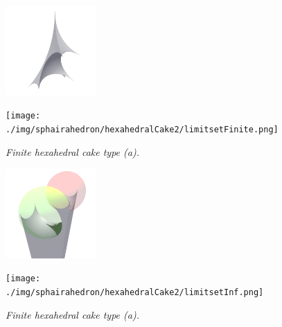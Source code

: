 \documentclass[suppldata, dvipdfmx]{interact}
\theoremstyle{plain}%
\theoremstyle{definition}
\theoremstyle{remark}
\theoremstyle{problemstyle}
\begin{document}
\begin{figure}[H]
 \begin{minipage}{0.5\textwidth}
  \begin{minipage}[t]{0.24\textwidth}
   \centering
   \includegraphics[width=1.35in, height=1.35in,
   keepaspectratio]{./img/sphairahedron/hexahedralCake2/sphairahedronFinite.png}
  \end{minipage}
  \hspace*{\fill}
  \begin{minipage}[t]{0.24\textwidth}
   \centering
   \texttt{[image: ./img/sphairahedron/hexahedralCake2/limitsetFinite.png]}
  \end{minipage}
  \hspace*{\fill}
  \caption{\textit{Finite hexahedral cake type (a).}}
  \label{fig:cakeFinite}
 \end{minipage}
 \hspace*{\fill}
 \begin{minipage}{0.5\textwidth}
  \begin{minipage}[t]{0.24\textwidth}
   \centering
   \includegraphics[width=1.35in, height=1.35in,
   keepaspectratio]{./img/sphairahedron/hexahedralCake2/sphairahedronInf.png}
  \end{minipage}
  \hspace*{\fill}
  \begin{minipage}[t]{0.24\textwidth}
   \centering
   \texttt{[image: ./img/sphairahedron/hexahedralCake2/limitsetInf.png]} 
  \end{minipage}
  \hspace*{\fill}
  \caption{\textit{Finite hexahedral cake type (a).}}
  \label{fig:cakeInf}
 \end{minipage}
\end{figure}
\end{document}
